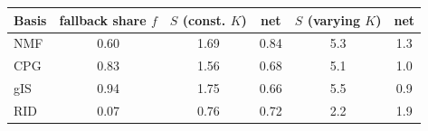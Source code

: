 \begin{tabular}{@{}lccccc@{}}
\toprule
Basis & fallback share $f$ & $S$ (const. $K$) & net & $S$ (varying $K$) & net \\
\midrule
NMF & 0.60 & 1.69 & 0.84 & 5.3 & 1.3 \\
CPG & 0.83 & 1.56 & 0.68 & 5.1 & 1.0 \\
gIS & 0.94 & 1.75 & 0.66 & 5.5 & 0.9 \\
RID & 0.07 & 0.76 & 0.72 & 2.2 & 1.9 \\
\bottomrule
\end{tabular}
